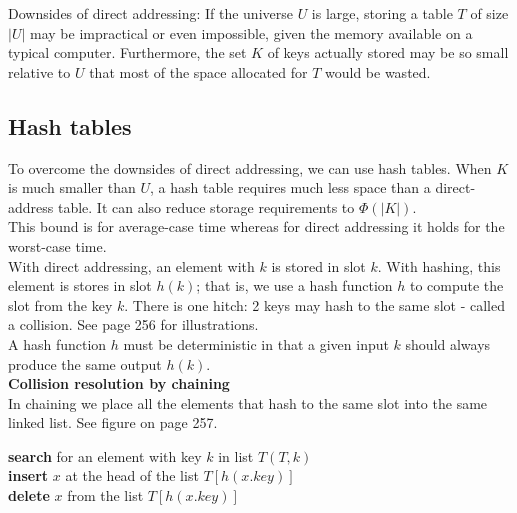 \documentclass[12pt]{article}
\begin{document}
Downsides of direct addressing: If the universe $U$ is large, storing a table $T$ of size $|U|$ may be impractical or even impossible, given the memory available on a typical computer. Furthermore, the set $K$ of keys actually stored may be so small relative to $U$ that most of the space allocated for $T$ would be wasted. 

\subsection{Hash tables}
To overcome the downsides of direct addressing, we can use hash tables. When $K$ is much smaller than $U$, a hash table requires much less space than a direct-address table. It can also reduce storage requirements to $\Phi (|K|)$. \\

This bound is for average-case time whereas for direct addressing it holds for the worst-case time. \\

With direct addressing, an element with $k$ is stored in slot $k$. With hashing, this element is stores in slot $h(k)$; that is, we use a hash function $h$ to compute the slot from the key $k$. There is one hitch: 2 keys may hash to the same slot - called a collision. See page 256 for illustrations. \\

A hash function $h$ must be deterministic in that a given input $k$ should always produce the same output $h(k)$. \\

\textbf{Collision resolution by chaining}\\
In chaining we place all the elements that hash to the same slot into the same linked list. See figure on page 257.

\begin{algorithm}
\begin{algorithmic}[1]
   \State \textbf{search} for an element with key $k$ in list $T(T, k)$\\
   
   \State \textbf{insert} $x$ at the head of the list $T[h(x.key)]$\\

   \State \textbf{delete} $x$ from the list $T[h(x.key)]$
\end{algorithmic}
\end{algorithm}
\end{document}
